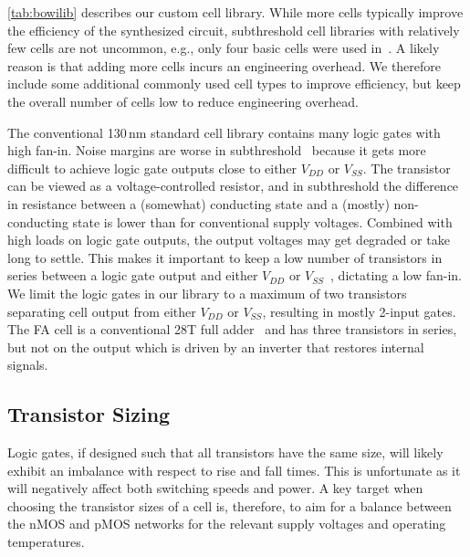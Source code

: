 \autoref{tab:bowilib} describes our custom cell library.
While more cells typically improve the efficiency of the synthesized circuit, subthreshold cell libraries with relatively few cells are not uncommon,
e.g., only four basic cells were used in~\cite{7062968}. A likely reason is that adding more cells incurs an engineering overhead.
We therefore include some additional commonly used cell types to improve efficiency, but keep the overall number of cells low to reduce engineering overhead.

The conventional 130\,nm standard cell library contains many logic gates with high fan-in.
Noise margins are worse in subthreshold~\cite{bol2011robust} because it gets more difficult to achieve logic gate outputs close to either $V_{DD}$ or $V_{SS}$.
The transistor can be viewed as a voltage-controlled resistor, and in subthreshold the difference in resistance between a (somewhat) conducting state and a (mostly) non-conducting state is lower than for conventional supply voltages.
Combined with high loads on logic gate outputs, the output voltages may get degraded or take long to settle.
This makes it important to keep a low number of transistors in series between a logic gate output and either $V_{DD}$ or $V_{SS}$~\cite{calhoun2005modeling}, dictating a low fan-in.  We limit the logic gates in our library to a maximum of two transistors separating cell output from either $V_{DD}$ or $V_{SS}$, resulting in mostly 2-input gates.
The FA cell is a conventional 28T full adder~\cite{full-adder:ISSCC1990} and has three transistors in series, but not on the output which is driven by an inverter that restores internal signals. 


\subsection{Transistor Sizing}

Logic gates, if designed such that all transistors have the same size, will likely exhibit an imbalance with respect to rise and fall times.  
This is unfortunate as it will negatively affect both switching speeds and power.  A key target when choosing the transistor sizes of a cell is, therefore, to aim for a balance between the nMOS and pMOS networks for the relevant supply voltages and operating temperatures.

